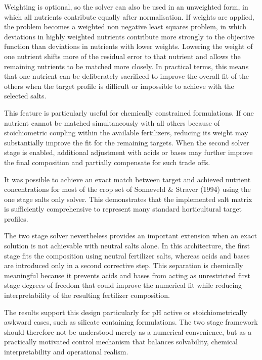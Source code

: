 \documentclass[
  letterpaper,
  DIV=11,
  numbers=noendperiod]{scrreprt}
\begin{document}
Weighting is optional, so the solver can also be used in an unweighted
form, in which all nutrients contribute equally after normalisation. If
weights are applied, the problem becomes a weighted non negative least
squares problem, in which deviations in highly weighted nutrients
contribute more strongly to the objective function than deviations in
nutrients with lower weights. Lowering the weight of one nutrient shifts
more of the residual error to that nutrient and allows the remaining
nutrients to be matched more closely. In practical terms, this means
that one nutrient can be deliberately sacrificed to improve the overall
fit of the others when the target profile is difficult or impossible to
achieve with the selected salts.

This feature is particularly useful for chemically constrained
formulations. If one nutrient cannot be matched simultaneously with all
others because of stoichiometric coupling within the available
fertilizers, reducing its weight may substantially improve the fit for
the remaining targets. When the second solver stage is enabled,
additional adjustment with acids or bases may further improve the final
composition and partially compensate for such trade offs.

It was possible to achieve an exact match between target and achieved
nutrient concentrations for most of the crop set of Sonneveld \& Straver
(1994) using the one stage salts only solver. This demonstrates that the
implemented salt matrix is sufficiently comprehensive to represent many
standard horticultural target profiles.

The two stage solver nevertheless provides an important extension when
an exact solution is not achievable with neutral salts alone. In this
architecture, the first stage fits the composition using neutral
fertilizer salts, whereas acids and bases are introduced only in a
second corrective step. This separation is chemically meaningful because
it prevents acids and bases from acting as unrestricted first stage
degrees of freedom that could improve the numerical fit while reducing
interpretability of the resulting fertilizer composition.

The results support this design particularly for pH active or
stoichiometrically awkward cases, such as silicate containing
formulations. The two stage framework should therefore not be understood
merely as a numerical convenience, but as a practically motivated
control mechanism that balances solvability, chemical interpretability
and operational realism.
\end{document}
